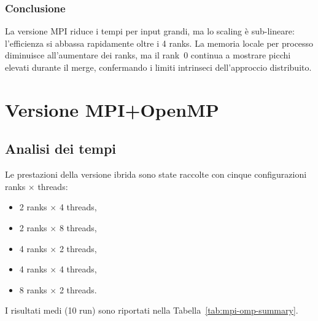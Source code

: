 			\subsubsection*{Conclusione}
				La versione MPI riduce i tempi per input grandi, ma lo scaling è sub-lineare: l’efficienza si abbassa rapidamente oltre i 4 ranks.
				La memoria locale per processo diminuisce all’aumentare dei ranks, ma il rank~0 continua a mostrare picchi elevati durante il merge,
				confermando i limiti intrinseci dell’approccio distribuito.
	
	\section{Versione MPI+OpenMP}
		
		\subsection{Analisi dei tempi}
			Le prestazioni della versione ibrida sono state raccolte con cinque configurazioni ranks $\times$ threads:
			\begin{itemize}
				\item 2 ranks $\times$ 4 threads,
				\item 2 ranks $\times$ 8 threads,
				\item 4 ranks $\times$ 2 threads,
				\item 4 ranks $\times$ 4 threads,
				\item 8 ranks $\times$ 2 threads.
			\end{itemize}
			I risultati medi (10 run) sono riportati nella Tabella~\ref{tab:mpi-omp-summary}.
			
